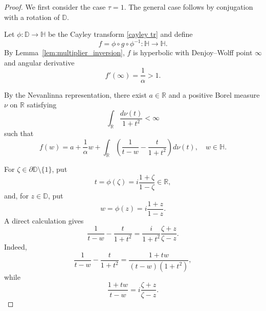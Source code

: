 \documentclass[10pt,a4paper]{amsart}
\numberwithin{equation}{section}
\begin{document}
\begin{proof}
We first consider the case $\tau=1$. The general case follows by
conjugation with a rotation of $\mathbb{D}$.

Let $\phi:\mathbb{D}\to\mathbb{H}$ be the Cayley transform \eqref{cayley tr}
and define
\begin{equation*}
f=\phi\circ g\circ\phi^{-1}:\mathbb{H}\to\mathbb{H}.
\end{equation*}
By Lemma~\ref{lem:multiplier_inversion}, $f$ is hyperbolic with
Denjoy--Wolff point $\infty$ and angular derivative
\begin{equation*}
f'(\infty)=\frac{1}{\alpha}>1.
\end{equation*}

By the Nevanlinna representation, there exist $a\in\mathbb{R}$ and a
positive Borel measure $\nu$ on $\mathbb{R}$ satisfying
\begin{equation*}
\int_{\mathbb{R}}\frac{d\nu(t)}{1+t^2}<\infty
\end{equation*}
such that
\begin{equation}
\label{eq:f_rep}
f(w)
=
a+\frac{1}{\alpha}w
+\int_{\mathbb{R}}
\left(
\frac{1}{t-w}-\frac{t}{1+t^2}
\right)d\nu(t),
\quad w\in\mathbb{H}.
\end{equation}

For $\zeta\in\partial\mathbb{D}\setminus\{1\}$, put
\begin{equation*}
t=\phi(\zeta)
=i\frac{1+\zeta}{1-\zeta}\in\mathbb{R},
\end{equation*}
and, for $z\in\mathbb{D}$, put
\begin{equation*}
w=\phi(z)=i\frac{1+z}{1-z}.
\end{equation*}
A direct calculation gives
\begin{equation}
\label{eq:kernel_id}
\frac{1}{t-w}-\frac{t}{1+t^2}
=
\frac{i}{1+t^2}\frac{\zeta+z}{\zeta-z}.
\end{equation}
Indeed,
\begin{equation*}
\frac{1}{t-w}-\frac{t}{1+t^2}
=
\frac{1+tw}{(t-w)(1+t^2)},
\end{equation*}
while
\begin{equation*}
\frac{1+tw}{t-w}
=
i\frac{\zeta+z}{\zeta-z}.
\end{equation*}


\end{proof}
\end{document}

